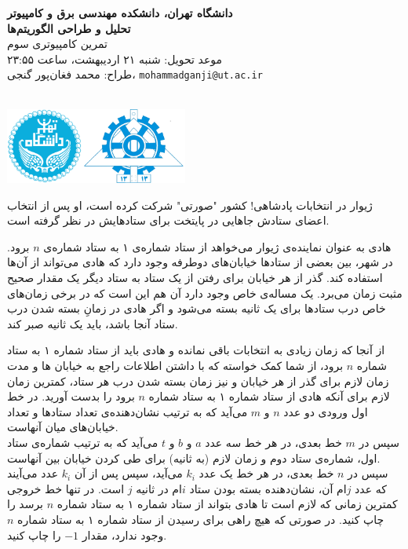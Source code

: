 \documentclass[11.5pt,a4paper,oneside]{article}
\makeatletter
\renewcommand{\contestname}{
دانشگاه تهران، دانشکده مهندسی برق و کامپیوتر \\
تحلیل و طراحی الگوریتم‌ها \\
}
\renewcommand{\contestauthor}{
تمرین کامپیوتری سوم \\ موعد تحویل: شنبه ۲۱ اردیبهشت، ساعت ۲۳:۵۵ \\ طراح:‌ محمد فغان‌پور گنجی،
\texttt{mohammadganji@ut.ac.ir}
}
\makeatother
\begin{document}
{\noindent \Large \bf \contestname}
{\contestauthor}

\begin{flushleft}
\nothing\\[-3.2cm]
\includegraphics[height=2.5cm]{../../../../static/pics/ut-eng.png}
\end{flushleft}

\def\problemCode{Election}
\def\problemEnglishTitle{Election}
\def\problemFarsiTitle{انتخابات}
\def\timeLimit{$2$ \second}
\def\memLimit{$256$ \megabytes}
\begin{problem}
ژیوار در انتخابات پادشاهی! کشور "صورتی" شرکت کرده است، او پس از انتخاب اعضای ستادش جاهایی در پایتخت برای ستادهایش در نظر گرفته است.

هادی به عنوان نماینده‌ی ژیوار می‌خواهد از ستاد شماره‌ی ۱ به ستاد شماره‌ی $n$ برود. در شهر، بین بعضی از ستاد‌ها خیابان‌های دوطرفه وجود دارد که هادی می‌تواند از آن‌ها استفاده کند. گذر از هر خیابان برای رفتن از یک ستاد به ستاد دیگر یک مقدار صحیح مثبت زمان می‌برد. یک مساله‌ی خاص وجود دارد آن هم این است که در برخی زمان‌های خاص درب ستاد‌ها برای یک ثانیه بسته می‌شود و اگر هادی در زمانِ بسته شدن درب ستاد آنجا باشد، باید یک ثانیه صبر کند.

از آنجا که زمان زیادی به انتخابات باقی نمانده و هادی باید از ستاد شماره ۱ به ستاد شماره $n$ برود، از شما کمک خواسته که با داشتن اطلاعات راجع به خیابان ها و مدت زمان لازم برای گذر از هر خیابان و نیز زمان بسته شدن درب هر ستاد، کمترین زمان لازم برای آنکه هادی از ستاد شماره ۱ به ستاد شماره $n$ برود را بدست آورید.
در خط اول ورودی  دو عدد $n$ و $m$ می‌آید که به ترتیب نشان‌دهنده‌ی تعداد ستاد‌ها و تعداد خیابان‌های میان آنهاست.\\
سپس در $m$ خط بعدی، در هر خط سه عدد $a$ و $b$ و $t$ می‌آید که به ترتیب شماره‌ی ستاد اول، شماره‌ی ستاد دوم و زمان لازم (به ثانیه) برای طی کردن خیابان بین آنهاست.\\
سپس در $n$ خط بعدی، در هر خط یک عدد
$k_{i}$
می‌آید، سپس پس از آن 
$k_{i}$
عدد می‌آیند که عدد $j$ام آن، نشان‌دهنده بسته بودن ستاد $i$ام در ثانیه $j$ است.
\outputDescription
در تنها خط خروجی کمترین زمانی که لازم است تا هادی بتواند از ستاد شماره ۱ به ستاد شماره $n$ برسد را چاپ کنید.
در صورتی که هیچ راهی برای رسیدن از ستاد شماره ۱ به ستاد شماره $n$ وجود ندارد، مقدار $-1$ را چاپ کنید.


\end{problem}
\end{document}
